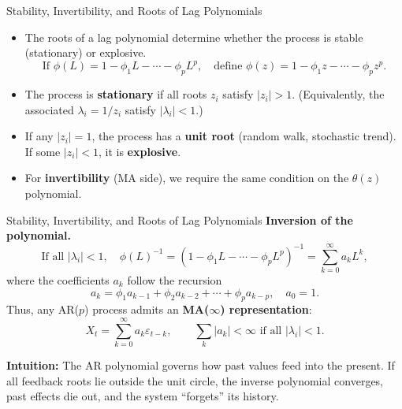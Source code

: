 \documentclass{beamer}
\begin{document}
\begin{frame}{Stability, Invertibility, and Roots of Lag Polynomials}
\small
\begin{itemize}
    \item The roots of a lag polynomial determine whether the process is stable (stationary) or explosive.
    \[
        \text{If } \phi(L) = 1 - \phi_1 L - \cdots - \phi_p L^p, 
        \quad \text{define } \phi(z) = 1 - \phi_1 z - \cdots - \phi_p z^p.
    \]
    \item The process is \textbf{stationary} if all roots $z_i$ satisfy $|z_i| > 1$.  
    (Equivalently, the associated $\lambda_i = 1/z_i$ satisfy $|\lambda_i| < 1$.)
    \item If any $|z_i| = 1$, the process has a \textbf{unit root} (random walk, stochastic trend).  
      If some $|z_i| < 1$, it is \textbf{explosive}.
    \item For \textbf{invertibility} (MA side), we require the same condition on the $\theta(z)$ polynomial.
\end{itemize}
\end{frame}

\begin{frame}{Stability, Invertibility, and Roots of Lag Polynomials}
\small
\textbf{Inversion of the polynomial.}
\[
\text{If all } |\lambda_i| < 1, \quad \phi(L)^{-1} = 
(1 - \phi_1 L - \cdots - \phi_p L^p)^{-1} 
= \sum_{k=0}^{\infty} a_k L^k,
\]
where the coefficients $a_k$ follow the recursion
\[
a_k = \phi_1 a_{k-1} + \phi_2 a_{k-2} + \cdots + \phi_p a_{k-p}, \quad a_0 = 1.
\]
Thus, any AR($p$) process admits an \textbf{MA($\infty$) representation}:
\[
X_t = \sum_{k=0}^{\infty} a_k \varepsilon_{t-k}, \qquad 
\sum_k |a_k| < \infty \text{ if all } |\lambda_i|<1.
\]

\textbf{Intuition:}  
The AR polynomial governs how past values feed into the present.  
If all feedback roots lie outside the unit circle, the inverse polynomial converges,  
past effects die out, and the system “forgets” its history.
\end{frame}
\end{document}
